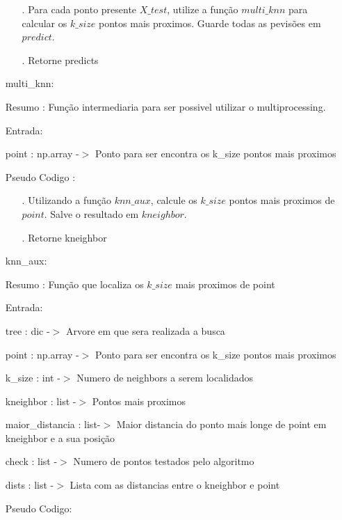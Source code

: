 \documentclass{article}
\begin{document}
\begin{enumerate}
		\begin{enumerate}
	
		\item[.] Para cada ponto presente $X\_test$, utilize a função $multi\_knn$ para calcular os $k\_size$ pontos mais proximos. Guarde todas as pevisões em $predict$.
		\item[.] Retorne predicts
	
		\end{enumerate}

	\item[] multi\_knn: 
	
		\quad Resumo : Função intermediaria para ser possivel utilizar o multiprocessing.

		\quad Entrada: 
	
			\qquad point : np.array -$>$ Ponto para ser encontra os k\_size pontos mais proximos
	
		\quad Pseudo Codigo :
		
		\begin{enumerate}
	
		\item[.] Utilizando a função $knn\_aux$, calcule os $k\_size$ pontos mais proximos de $point$. Salve o resultado em $kneighbor$.
		\item[.] Retorne kneighbor

		\end{enumerate}

	\item[] knn\_aux: 
	
		\quad Resumo : Função que localiza os $k\_size$ mais proximos de point

		\quad Entrada: 
	
			\qquad tree : dic -$>$ Arvore em que sera realizada a busca

			\qquad point : np.array -$>$ Ponto para ser encontra os k\_size pontos mais proximos

			\qquad k\_size : int -$>$ Numero de neighbors a serem localidados

			\qquad kneighbor : list -$>$ Pontos mais proximos

			\qquad maior\_distancia : list-$>$ Maior distancia do ponto mais longe de point em kneighbor e a sua posição

			\qquad check : list -$>$ Numero de pontos testados pelo algoritmo

			\qquad dists : list -$>$ Lista com as distancias entre o kneighbor e point
	
		\quad Pseudo Codigo:
		

\end{enumerate}
\end{document}
